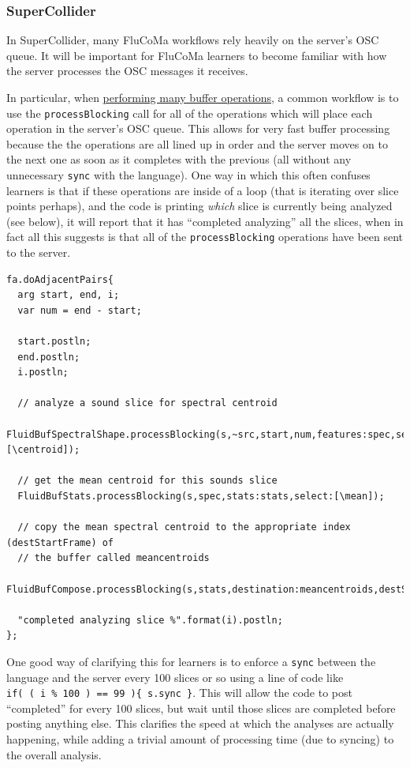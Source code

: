 \documentclass{article}
\begin{document}
\subsubsection{SuperCollider}\label{sc}

In SuperCollider, many FluCoMa workflows rely heavily on the server's
OSC queue. It will be important for FluCoMa learners to become familiar
with how the server processes the OSC messages it receives.

In particular, when
\href{https://www.youtube.com/watch?v=sabA8p8Y-Xs&list=PLLzzOXU4pTgIZREPJy3Y6oivWI9x-nVge&index=2}{performing
many buffer operations}, a common workflow is to use the
\texttt{processBlocking} call for all of the operations which will place
each operation in the server's OSC queue. This allows for very fast
buffer processing because the the operations are all lined up in order
and the server moves on to the next one as soon as it completes with the
previous (all without any unnecessary \texttt{sync} with the language).
One way in which this often confuses learners is that if these
operations are inside of a loop (that is iterating over slice points
perhaps), and the code is printing \emph{which} slice is currently being
analyzed (see below), it will report that it has ``completed analyzing''
all the slices, when in fact all this suggests is that all of the
\texttt{processBlocking} operations have been sent to the server.

\begin{verbatim}
fa.doAdjacentPairs{
  arg start, end, i;
  var num = end - start;
  
  start.postln;
  end.postln;
  i.postln;

  // analyze a sound slice for spectral centroid
  FluidBufSpectralShape.processBlocking(s,~src,start,num,features:spec,select:[\centroid]);

  // get the mean centroid for this sounds slice
  FluidBufStats.processBlocking(s,spec,stats:stats,select:[\mean]);

  // copy the mean spectral centroid to the appropriate index (destStartFrame) of
  // the buffer called meancentroids
  FluidBufCompose.processBlocking(s,stats,destination:meancentroids,destStartFrame:i);

  "completed analyzing slice %".format(i).postln;
};
\end{verbatim}

One good way of clarifying this for learners is to enforce a
\texttt{sync} between the language and the server every 100 slices or so
using a line of code like
\texttt{if(\ (\ i\ \%\ 100\ )\ ==\ 99\ )\{\ s.sync\ \}}. This will allow
the code to post ``completed'' for every 100 slices, but wait until
those slices are completed before posting anything else. This clarifies
the speed at which the analyses are actually happening, while adding a
trivial amount of processing time (due to syncing) to the overall
analysis.
\end{document}
